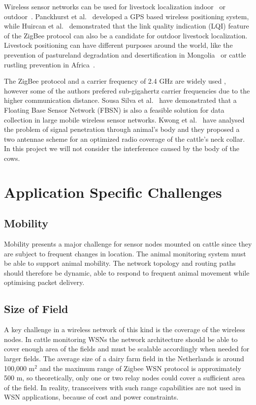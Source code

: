 \documentclass[conference]{IEEEtran}
\begin{document}
Wireless sensor networks can be used for livestock localization
indoor~\cite{AS13WI} or outdoor~\cite{PA15SO, HU10ZI}. Panckhurst et
al.~\cite{PA15SO} developed a GPS based wireless positioning system, while
Huircan et al.~\cite{HU10ZI} demonstrated that the link quality indication
(LQI) feature of the ZigBee protocol can also be a candidate for outdoor
livestock localization. Livestock positioning can have different purposes
around the world, like the prevention of pastureland degradation and
desertification in Mongolia~\cite{CH13CL} or cattle rustling prevention in
Africa~\cite{MA14CA}.

The ZigBee protocol and a carrier frequency of 2.4 GHz are widely used
\cite{KU15AZ, MA14CA, HU10ZI, NA12MO}, however some of the authors
\cite{SO05AW, OK12DE, OK13DE, PA15SO} prefered sub-gigahertz carrier
frequencies due to the higher communication distance. Sousa Silva et
al.~\cite{SO05AW} have demonstrated that a Floating Base Sensor Network (FBSN)
is also a feasible solution for data collection in large mobile wireless sensor
networks. Kwong et al.~\cite{KW09WI} have analysed the problem of signal
penetration through animal's body and they proposed a two antennae scheme for
an optimized radio coverage of the cattle's neck collar. In this project we
will not consider the interference caused by the body of the cows.

\section{Application Specific Challenges}

\subsection{Mobility}

Mobility presents a major challenge for sensor nodes mounted on cattle since
they are subject to frequent changes in location.  The animal monitoring system
must be able to support animal mobility. The network topology and routing paths
should therefore be dynamic, able to respond to frequent animal movement while
optimising packet delivery.

\subsection{Size of Field}

A key challenge in a wireless network of this kind is the coverage of the
wireless nodes. In cattle monitoring WSNs the network architecture should be
able to cover enough area of the fields and must be scalable accordingly when
needed for larger fields. The average size of a dairy farm field in the
Netherlands is around 100,000 m$^2$ and the maximum range of Zigbee WSN
protocol is approximately 500 m, so theoretically, only one or two relay nodes
could cover a sufficient area of the field. In reality, transceivers with such
range capabilities are not used in WSN applications, because of cost and power
constraints. 
\end{document}

